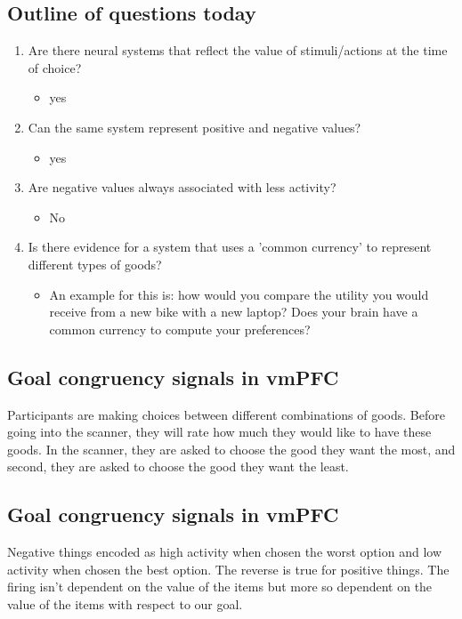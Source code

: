 \subsection{Outline of questions today}
\begin{enumerate}
    \item Are there neural systems that reflect the value of stimuli/actions at the time of choice?
    \begin{itemize}
        \item yes
    \end{itemize}
    \item Can the same system represent positive and negative values?
    \begin{itemize}
        \item yes
    \end{itemize}
    \item Are negative values always associated with less activity?
    \begin{itemize}
        \item No
    \end{itemize}
    \item Is there evidence for a system that uses a 'common currency' to represent different types of goods?
    \begin{itemize}
        \item An example for this is: how would you compare the utility you would receive from a new bike with a new laptop? Does your brain have a common currency to compute your preferences?
    \end{itemize}
\end{enumerate}
\subsection{Goal congruency signals in vmPFC}
Participants are making choices between different combinations of goods. Before going into the scanner, they will rate how much they would like to have these goods. In the scanner, they are asked to choose the good they want the most, and second, they are asked to choose the good they want the least.
\subsection{Goal congruency signals in vmPFC}
Negative things encoded as high activity when chosen the worst option and low activity when chosen the best option. The reverse is true for positive things. The firing isn't dependent on the value of the items but more so dependent on the value of the items with respect to our goal.
